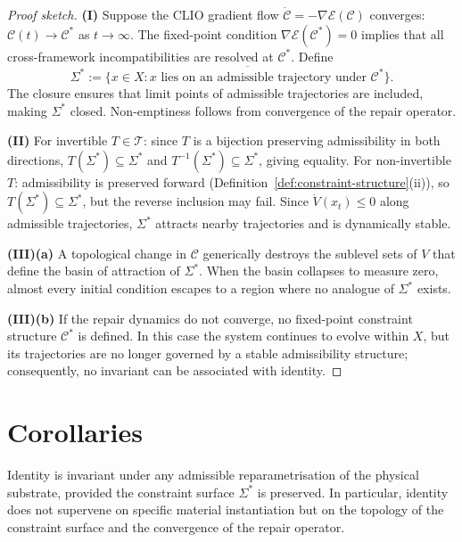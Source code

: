 \documentclass[11pt,openany]{book}
\begin{document}
\begin{proof}[Proof sketch]
\textbf{(I)} Suppose the CLIO gradient flow
$\dot{\mathcal{C}} = -\nabla \mathcal{E}(\mathcal{C})$
converges: $\mathcal{C}(t) \to \mathcal{C}^*$ as
$t \to \infty$.  The fixed-point condition
$\nabla \mathcal{E}(\mathcal{C}^*) = 0$ implies that all
cross-framework incompatibilities are resolved at
$\mathcal{C}^*$.  Define
\[
  \Sigma^* := \overline{\bigl\{x \in X : x \text{ lies on
    an admissible trajectory under } \mathcal{C}^*\bigr\}}.
\]
The closure ensures that limit points of admissible
trajectories are included, making $\Sigma^*$ closed.
Non-emptiness follows from convergence of the repair
operator.

\textbf{(II)} For invertible $T \in \mathcal{T}$: since $T$
is a bijection preserving admissibility in both directions,
$T(\Sigma^*) \subseteq \Sigma^*$ and $T^{-1}(\Sigma^*)
\subseteq \Sigma^*$, giving equality.  For non-invertible
$T$: admissibility is preserved forward
(Definition~\ref{def:constraint-structure}(ii)), so
$T(\Sigma^*) \subseteq \Sigma^*$, but the reverse inclusion
may fail.  Since $\dot{V}(x_t) \le 0$ along admissible
trajectories, $\Sigma^*$ attracts nearby trajectories and
is dynamically stable.

\textbf{(III)(a)} A topological change in $\mathcal{C}$
generically destroys the sublevel sets of $V$ that define
the basin of attraction of $\Sigma^*$.  When the basin
collapses to measure zero, almost every initial condition
escapes to a region where no analogue of $\Sigma^*$ exists.

\textbf{(III)(b)} If the repair dynamics do not converge,
no fixed-point constraint structure $\mathcal{C}^*$ is
defined.  In this case the system continues to evolve
within $X$, but its trajectories are no longer governed by
a stable admissibility structure; consequently, no invariant
can be associated with identity.
\end{proof}

\section{Corollaries}
\label{sec:corollaries}

\begin{corollary}
\label{cor:substrate}
Identity is invariant under any admissible reparametrisation
of the physical substrate, provided the constraint surface
$\Sigma^*$ is preserved.  In particular, identity does not
supervene on specific material instantiation but on the
topology of the constraint surface and the convergence of
the repair operator.
\end{corollary}
\end{document}
